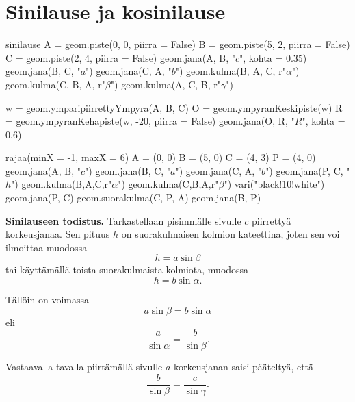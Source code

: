 \section{Sinilause ja kosinilause}

\begin{luoKuva}{sinilause}
A = geom.piste(0, 0, piirra = False)
B = geom.piste(5, 2, piirra = False)
C = geom.piste(2, 4, piirra = False)
geom.jana(A, B, "$c$", kohta = 0.35)
geom.jana(B, C, "$a$")
geom.jana(C, A, "$b$")
geom.kulma(B, A, C, r"$\alpha$")
geom.kulma(C, B, A, r"$\beta$")
geom.kulma(A, C, B, r"$\gamma$")

w = geom.ymparipiirrettyYmpyra(A, B, C)
O = geom.ympyranKeskipiste(w)
R = geom.ympyranKehapiste(w, -20, piirra = False)
geom.jana(O, R, "$R$", kohta = 0.6)
\end{luoKuva}


\begin{center}
 \begin{kuva}
	rajaa(minX = -1, maxX = 6)
	A = (0, 0)
	B = (5, 0)
	C = (4, 3)
	P = (4, 0)
	geom.jana(A, B, "$c$")
	geom.jana(B, C, "$a$")
	geom.jana(C, A, "$b$")
	geom.jana(P, C, "$h$")
	geom.kulma(B,A,C,r"$\alpha$")
	geom.kulma(C,B,A,r"$\beta$")
	vari("black!10!white")
	geom.jana(P, C)
	geom.suorakulma(C, P, A)
	geom.jana(B, P)
\end{kuva}
\end{center}


\textbf{Sinilauseen todistus.} Tarkastellaan pisimmälle sivulle $c$ piirrettyä korkeusjanaa.
Sen pituus $h$ on suorakulmaisen kolmion kateettina, joten sen voi ilmoittaa muodossa
\[
h = a \sin \beta
\]
tai käyttämällä toista suorakulmaista kolmiota, muodossa
\[
h = b \sin \alpha .
\]

Tällöin on voimassa
\[
a \sin \beta = b \sin \alpha
\]
eli
\[
\frac{a}{\sin \alpha} = \frac{b}{\sin \beta}.
\]

Vastaavalla tavalla piirtämällä sivulle $a$ korkeusjanan saisi pääteltyä, että
\[
\frac{b}{\sin \beta} = \frac{c}{\sin \gamma}.
\]

